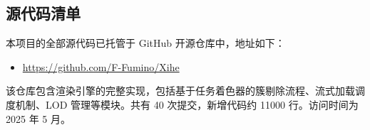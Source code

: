 {    %
        

        


    \subsection{源代码清单}

    本项目的全部源代码已托管于 GitHub 开源仓库中，地址如下：

    \begin{itemize}
    \item \url{https://github.com/F-Fumino/Xihe}
    \end{itemize}

    该仓库包含渲染引擎的完整实现，包括基于任务着色器的簇剔除流程、流式加载调度机制、LOD 管理等模块。共有 40 次提交，新增代码约 11000 行。访问时间为 2025 年 5 月。

    \removeappendixsubsecmajornumbering
}